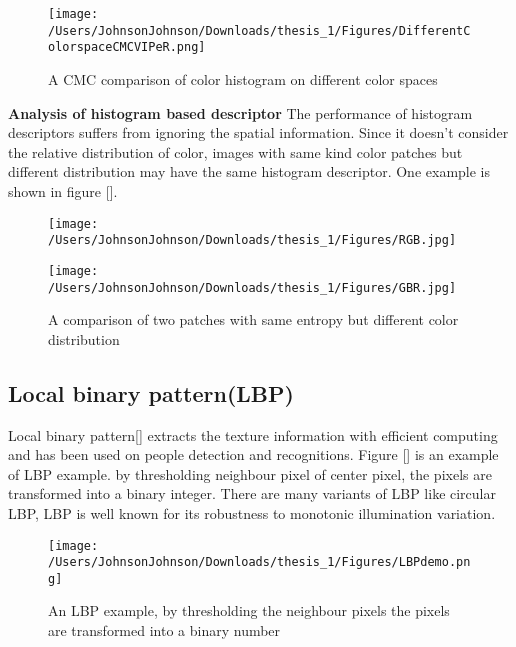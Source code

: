 \begin{figure}
\centering

\texttt{[image: /Users/JohnsonJohnson/Downloads/thesis\_1/Figures/DifferentColorspaceCMCVIPeR.png]}
\caption{A CMC comparison of color histogram on different color spaces }
\vspace{0em}
\end{figure} 

\textbf{Analysis of histogram based descriptor} The performance of histogram descriptors suffers from ignoring the spatial information. Since it doesn't consider the relative distribution of color, images with same kind color patches but different distribution may have the same histogram descriptor. One example is shown in figure [].

\begin{figure}[H]
\begin{minipage}[t]{0.5\linewidth}
\centering
\texttt{[image: /Users/JohnsonJohnson/Downloads/thesis\_1/Figures/RGB.jpg]}
\label{fig:side:a}
\end{minipage}%
\begin{minipage}[t]{0.5\linewidth}
\centering
\texttt{[image: /Users/JohnsonJohnson/Downloads/thesis\_1/Figures/GBR.jpg]}
\label{fig:side:b}
\end{minipage}
\caption{A comparison of two patches with same entropy but different color distribution}
\end{figure}

\subsection{Local binary pattern(LBP)}
Local binary pattern[] extracts the texture information with efficient computing and has been used on people detection and recognitions. Figure [] is an example of LBP example. by thresholding neighbour pixel of center pixel, the pixels are transformed into a binary integer. There are many variants of LBP like circular LBP, 
LBP is well known for its robustness to monotonic illumination variation.
\begin{figure}[H]
\centering
\texttt{[image: /Users/JohnsonJohnson/Downloads/thesis\_1/Figures/LBPdemo.png]}
\caption{An LBP example, by thresholding the neighbour pixels the pixels are transformed into a binary number }
\vspace{0em}
\end{figure}

